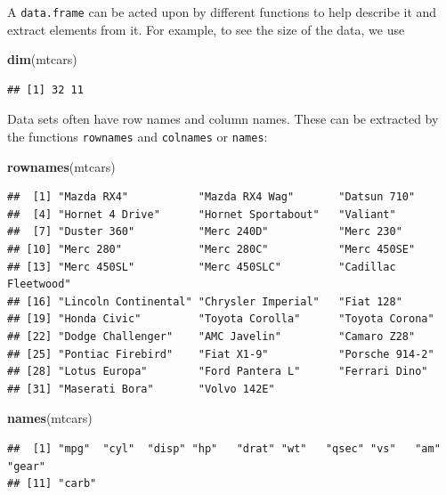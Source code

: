 \documentclass[12pt,letterpaperpaper,openany]{book}
\newenvironment{Shaded}{\begin{snugshade}}{\end{snugshade}}
\newcommand{\KeywordTok}[1]{\textcolor[rgb]{0.13,0.29,0.53}{\textbf{#1}}}
\newcommand{\NormalTok}[1]{#1}
\begin{document}
A \texttt{data.frame} can be acted upon by different functions to help describe it and extract elements from it. For example, to see the size of the data, we use

\begin{Shaded}
\begin{Highlighting}[]
\KeywordTok{dim}\NormalTok{(mtcars)}
\end{Highlighting}
\end{Shaded}

\begin{verbatim}
## [1] 32 11
\end{verbatim}

Data sets often have row names and column names. These can be extracted by the functions \texttt{rownames} and
\texttt{colnames} or \texttt{names}:

\begin{Shaded}
\begin{Highlighting}[]
\KeywordTok{rownames}\NormalTok{(mtcars)}
\end{Highlighting}
\end{Shaded}

\begin{verbatim}
##  [1] "Mazda RX4"           "Mazda RX4 Wag"       "Datsun 710"         
##  [4] "Hornet 4 Drive"      "Hornet Sportabout"   "Valiant"            
##  [7] "Duster 360"          "Merc 240D"           "Merc 230"           
## [10] "Merc 280"            "Merc 280C"           "Merc 450SE"         
## [13] "Merc 450SL"          "Merc 450SLC"         "Cadillac Fleetwood" 
## [16] "Lincoln Continental" "Chrysler Imperial"   "Fiat 128"           
## [19] "Honda Civic"         "Toyota Corolla"      "Toyota Corona"      
## [22] "Dodge Challenger"    "AMC Javelin"         "Camaro Z28"         
## [25] "Pontiac Firebird"    "Fiat X1-9"           "Porsche 914-2"      
## [28] "Lotus Europa"        "Ford Pantera L"      "Ferrari Dino"       
## [31] "Maserati Bora"       "Volvo 142E"
\end{verbatim}

\begin{Shaded}
\begin{Highlighting}[]
\KeywordTok{names}\NormalTok{(mtcars)}
\end{Highlighting}
\end{Shaded}

\begin{verbatim}
##  [1] "mpg"  "cyl"  "disp" "hp"   "drat" "wt"   "qsec" "vs"   "am"   "gear"
## [11] "carb"
\end{verbatim}
\end{document}
